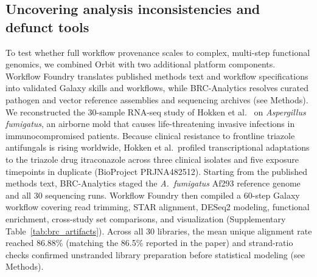 \documentclass[11pt,letterpaper]{article}
\begin{document}
\subsection{Uncovering analysis inconsistencies and defunct tools}

To test whether full workflow provenance scales to complex, multi-step functional genomics, we combined Orbit with two additional platform components. Workflow Foundry \cite{foundry2026} translates published methods text and workflow specifications into validated Galaxy skills and workflows, while BRC-Analytics \cite{brcanalytics2026} resolves curated pathogen and vector reference assemblies and sequencing archives (see Methods). We reconstructed the 30-sample RNA-seq study of Hokken et al.\ \cite{hokken2018} on \textit{Aspergillus fumigatus}, an airborne mold that causes life-threatening invasive infections in immunocompromised patients. Because clinical resistance to frontline triazole antifungals is rising worldwide, Hokken et al.\ profiled transcriptional adaptations to the triazole drug itraconazole across three clinical isolates and five exposure timepoints in duplicate (BioProject PRJNA482512). Starting from the published methods text, BRC-Analytics staged the \textit{A.\ fumigatus} Af293 reference genome and all 30 sequencing runs. Workflow Foundry then compiled a 60-step Galaxy workflow covering read trimming, STAR alignment, DESeq2 modeling, functional enrichment, cross-study set comparisons, and visualization (Supplementary Table~\ref{tab:brc_artifacts}). Across all 30 libraries, the mean unique alignment rate reached 86.88\% (matching the 86.5\% reported in the paper) and strand-ratio checks confirmed unstranded library preparation before statistical modeling (see Methods).
\end{document}
